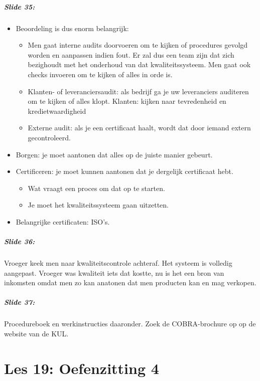 \documentclass[10pt,a4paper]{report}
\begin{document}
\paragraph{Slide 35:}
\begin{itemize} 
\item Beoordeling is dus enorm belangrijk:
\begin{itemize}
\item Men gaat interne audits doorvoeren om te kijken of procedures gevolgd worden en aanpassen indien fout. Er zal dus een team zijn dat zich bezighoudt met het onderhoud van dat kwaliteitssysteem. Men gaat ook checks invoeren om te kijken of alles in orde is.
\item Klanten- of leveranciersaudit: als bedrijf ga je uw leveranciers auditeren om te kijken of alles klopt. Klanten: kijken naar tevredenheid en kredietwaardigheid
\item Externe audit: als je een certificaat haalt, wordt dat door iemand extern gecontroleerd. 
\end{itemize}
\item Borgen: je moet aantonen dat alles op de juiste manier gebeurt.
\item Certificeren: je moet kunnen aantonen dat je dergelijk certificaat hebt. 
\begin{itemize}
\item Wat vraagt een proces om dat op te starten. 
\item Je moet het kwaliteitssysteem gaan uitzetten.
\end{itemize}
\item Belangrijke certificaten: ISO's.
\end{itemize}

\paragraph{Slide 36:} Vroeger keek men naar kwaliteitscontrole achteraf. Het systeem is volledig aangepast. Vroeger was kwaliteit iets dat kostte, nu is het een bron van inkomsten omdat men zo kan anatonen dat men producten kan en mag verkopen. 

\paragraph{Slide 37:} Procedureboek en werkinstructies daaronder. 
Zoek de COBRA-brochure op op de website van de KUL.

\chapter{Les 19: Oefenzitting 4}
\end{document}
